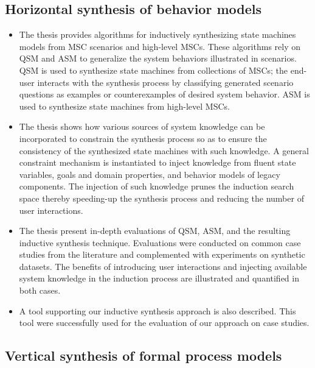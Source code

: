 
\subsection{Horizontal synthesis of behavior models\label{subsection:intro-contrib-inductive-synthesis}}
\begin{itemize}
\item The thesis provides algorithms for inductively synthesizing state machines models from MSC scenarios and high-level MSCs. These algorithms rely on QSM and ASM to generalize the system behaviors illustrated in scenarios. QSM is used to synthesize state machines from collections of MSCs; the end-user interacts with the synthesis process by classifying generated scenario questions as examples or counterexamples of desired system behavior. ASM is used to synthesize state machines from high-level MSCs.
\item The thesis shows how various sources of system knowledge can be incorporated to constrain the synthesis process so as to ensure the consistency of the synthesized state machines with such knowledge. A general constraint mechanism is instantiated to inject knowledge from fluent state variables, goals and domain properties, and behavior models of legacy components. The injection of such knowledge prunes the induction search space thereby speeding-up the synthesis process and reducing the number of user interactions.
\item The thesis present in-depth evaluations of QSM, ASM, and the resulting inductive synthesis technique. Evaluations were conducted on common case studies from the literature and complemented with experiments on synthetic datasets. The benefits of introducing user interactions and injecting available system knowledge in the induction process are illustrated and quantified in both cases.
\item A tool supporting our inductive synthesis approach is also described. This tool were successfully used for the evaluation of our approach on case studies.
\end{itemize}


\subsection{Vertical synthesis of formal process models\label{subsection:intro-contib-supporting-process-models}}


